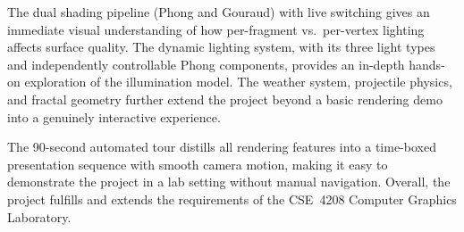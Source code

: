 \documentclass[12pt,a4paper]{article}
\begin{document}
The dual shading pipeline (Phong and Gouraud) with live switching gives an immediate visual understanding of how per-fragment vs.\ per-vertex lighting affects surface quality. The dynamic lighting system, with its three light types and independently controllable Phong components, provides an in-depth hands-on exploration of the illumination model. The weather system, projectile physics, and fractal geometry further extend the project beyond a basic rendering demo into a genuinely interactive experience.

The 90-second automated tour distills all rendering features into a time-boxed presentation sequence with smooth camera motion, making it easy to demonstrate the project in a lab setting without manual navigation. Overall, the project fulfills and extends the requirements of the CSE~4208 Computer Graphics Laboratory.
\end{document}
